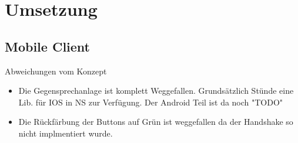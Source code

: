 \section{Umsetzung}\label{sec:umsetzung}

\subsection{Mobile Client}\label{subsec:mobile-client-realisation}
Abweichungen vom Konzept
\begin{itemize}
    \item Die Gegensprechanlage ist komplett Weggefallen.
    \subitem Grundsätzlich Stünde eine Lib. für IOS in NS zur Verfügung. Der Android Teil ist da noch "TODO"
    \item Die Rückfärbung der Buttons auf Grün ist weggefallen da der Handshake so nicht implmentiert wurde.
\end{itemize}